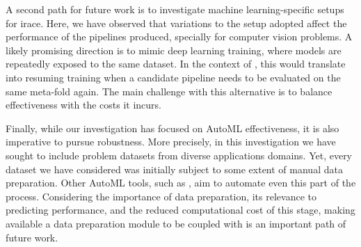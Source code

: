 A second path for future work is to investigate machine learning-specific setups for irace. Here, we have observed that variations to the setup adopted affect the performance of the pipelines produced, specially for computer vision problems. A likely promising direction is to mimic deep learning training, where models are repeatedly exposed to the same dataset. In the context of \isklearn, this would translate into resuming training when a candidate pipeline needs to be evaluated on the same meta-fold again. The main challenge with this alternative is to balance effectiveness with the costs it incurs.


Finally, while our investigation has focused on AutoML effectiveness, it is also imperative to pursue robustness. More precisely, in this investigation we have sought to include problem datasets from diverse applications domains. Yet, every dataset we have considered was initially subject to some extent of manual data preparation. Other AutoML tools, such as \autosklearn, aim to automate even this part of the process. Considering the importance of data preparation, its relevance to predicting performance, and the reduced computational cost of this stage, making available a data preparation module to be coupled with \isklearn is an important path of future work.

